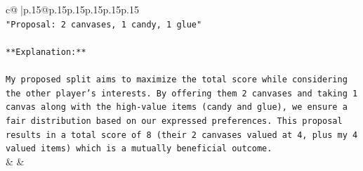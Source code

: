 \documentclass{article}
\begin{document}
{\begin{supertabular}{c@{$\;$}|p{.15\linewidth}@{}p{.15\linewidth}p{.15\linewidth}p{.15\linewidth}p{.15\linewidth}p{.15\linewidth}}
{{{\\ 
\texttt{"Proposal: 2 canvases, 1 candy, 1 glue"} \\
\\ 
\texttt{**Explanation:**} \\
\\ 
\texttt{My proposed split aims to maximize the total score while considering the other player's interests. By offering them 2 canvases and taking 1 canvas along with the high{-}value items (candy and glue), we ensure a fair distribution based on our expressed preferences. This proposal results in a total score of 8 (their 2 canvases valued at 4, plus my 4 valued items) which is a mutually beneficial outcome.} \\
            }
        }
    }
    & & \\ \\


\end{supertabular}}
\end{document}
